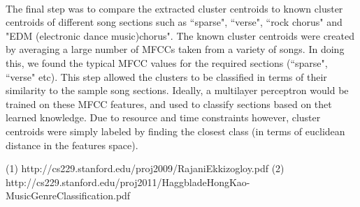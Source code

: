 \\
The final step was to compare the extracted cluster centroids to known cluster centroids of different song sections such as ``sparse", ``verse", ``rock chorus" and "EDM (electronic dance music)chorus". The known cluster centroids were created by averaging a large number of MFCCs taken from a variety of songs. In doing this, we found the typical MFCC values for the required sections (``sparse", ``verse" etc). This step allowed the clusters to be classified in terms of their similarity to the sample song sections. Ideally, a multilayer perceptron would be trained on these MFCC features, and used to classify sections based on thet learned knowledge. Due to resource and time constraints however, cluster centroids were simply labeled by finding the closest class (in terms of euclidean distance in the features space). 



(1) http://cs229.stanford.edu/proj2009/RajaniEkkizogloy.pdf
(2)	http://cs229.stanford.edu/proj2011/HaggbladeHongKao-MusicGenreClassification.pdf